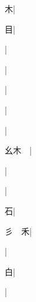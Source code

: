 \begin{multicols}{2}
{{\cjk{}{\cnsym{}　}{\cnsym{}　}木}|{}\par
{\cjk{}{\cnsym{}　}{\cnsym{}　}目}|{}\par
{\cjk{}{\cnsym{}　}{\cnsym{}　}{\cnsym{}　}}|{}\par
{\cjk{}{\cnsym{}　}{\cnsym{}　}{\cnsym{}　}}|{}\par
{\cjk{}{\cnsym{}　}{\cnsym{}　}{\cnsym{}　}}|{}\par
{\cjk{}{\cnsym{}　}{\cnsym{}　}{\cnsym{}　}}|{}\par
{\cjk{}{\cnsym{}　}{\cnsym{}　}{\cnsym{}　}}|{}\par
{\cjk{}幺木{\cnsym{}　}}|{}\par
{\cjk{}{\cnsym{}　}{\cnsym{}　}{\cnsym{}　}}|{}\par
{\cjk{}{\cnsym{}　}{\cnsym{}　}{\cnsym{}　}}|{}\par
{\cjk{}{\cnsym{}　}{\cnsym{}　}石}|{}\par
{\cjk{}彡{\cnsym{}　}禾}|{}\par
{\cjk{}{\cnsym{}　}{\cnsym{}　}{\cnsym{}　}}|{}\par
{\cjk{}{\cnsym{}　}{\cnsym{}　}白}|{}\par
{\cjk{}{\cnsym{}　}{\cnsym{}　}{\cnsym{}　}}|{}\par
}
\end{multicols}
